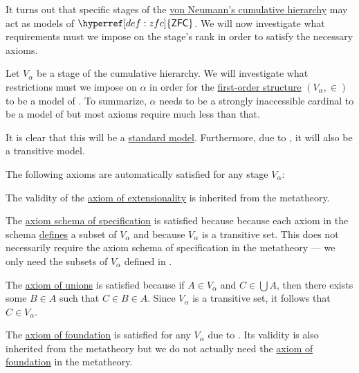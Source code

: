 \begin{remark}\label{thm:cumulative_hierarchy_model_of_zfc}
  It turns out that specific stages of the \hyperref[def:cumulative_hierarchy]{von Neumann's cumulative hierarchy} may act as models of \( \hyperref[def:zfc]{\logic{ZFC}} \). We will now investigate what requirements must we impose on the stage's rank in order to satisfy the necessary axioms.

  Let \( V_\alpha \) be a stage of the cumulative hierarchy. We will investigate what restrictions must we impose on \( \alpha \) in order for the \hyperref[def:first_order_structure]{first-order structure} \( (V_\alpha, \in) \) to be a model of . To summarize, \( \alpha \) needs to be a strongly inaccessible cardinal to be a model of  but most axioms require much less than that.

  It is clear that this will be a \hyperref[rem:standard_model_of_set_theory]{standard model}. Furthermore, due to , it will also be a transitive model.

  The following axioms are automatically satisfied for any stage \( V_\alpha \):
  \begin{thmenum}[series=thm:cumulative_hierarchy_model_of_zfc]
     The validity of the \hyperref[def:zfc/extensionality]{axiom of extensionality} is inherited from the metatheory.

     The \hyperref[def:zfc/specification]{axiom schema of specification} is satisfied because because each axiom in the schema \hyperref[def:first_order_definability]{defines} a subset of \( V_\alpha \) and because \( V_\alpha \) is a transitive set. This does not necessarily require the axiom schema of specification in the metatheory --- we only need the subsets of \( V_\alpha \) defined in .

     The \hyperref[def:zfc/union]{axiom of unions} is satisfied because if \( A \in V_\alpha \) and \( C \in \bigcup A \), then there exists some \( B \in A \) such that \( C \in B \in A \). Since \( V_\alpha \) is a transitive set, it follows that \( C \in V_\alpha \).

     The \hyperref[def:zfc/foundation]{axiom of foundation} is satisfied for any \( V_\alpha \) due to . Its validity is also inherited from the metatheory but we do not actually need the \hyperref[def:zfc/foundation]{axiom of foundation} in the metatheory.


\end{thmenum}
\end{remark}
